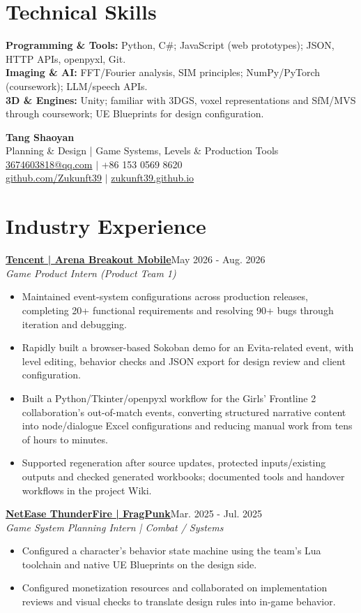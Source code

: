 \documentclass[a4paper,11pt]{article}
\newcommand{\resumeSubheading}[3]{\textbf{#1}\hfill{\small #3}\\{\small\textit{#2}}\par\vspace{3pt}}
\newcommand{\resumeItemListStart}{\begin{itemize}[leftmargin=13pt,label=\textbullet,itemsep=2.5pt,topsep=3pt,parsep=0pt]\fontsize{10.5pt}{13.2pt}\selectfont}
\newcommand{\resumeItemListEnd}{\end{itemize}\vspace{2pt}}
\newcommand{\resumeItem}[1]{\item #1}
\begin{document}
\section{Technical Skills}
{\fontsize{10.5pt}{13.2pt}\selectfont
\textbf{Programming \& Tools:} Python, C\#; JavaScript (web prototypes); JSON, HTTP APIs, openpyxl, Git.\\[2pt]
\textbf{Imaging \& AI:} FFT/Fourier analysis, SIM principles; NumPy/PyTorch (coursework); LLM/speech APIs.\\[2pt]
\textbf{3D \& Engines:} Unity; familiar with 3DGS, voxel representations and SfM/MVS through coursework; UE Blueprints for design configuration.\\[2pt]
}
\newpage
\begin{center}
{\Huge\bfseries Tang Shaoyan}\\[3pt]
{\small Planning \& Design | Game Systems, Levels \& Production Tools}\\[3pt]
{\small \href{mailto:3674603818@qq.com}{3674603818@qq.com} $|$ +86 153 0569 8620}\\[2pt]
{\small \href{https://github.com/Zukunft39}{github.com/Zukunft39} $|$ \href{https://zukunft39.github.io}{zukunft39.github.io}}
\end{center}\vspace{-6pt}
\section{Industry Experience}
\resumeSubheading{\href{https://zukunft39.github.io/projects/tencent.html}{Tencent | Arena Breakout Mobile}}{Game Product Intern (Product Team 1)}{May 2026 - Aug. 2026}
\resumeItemListStart
\resumeItem{Maintained event-system configurations across production releases, completing 20+ functional requirements and resolving 90+ bugs through iteration and debugging.}
\resumeItem{Rapidly built a browser-based Sokoban demo for an Evita-related event, with level editing, behavior checks and JSON export for design review and client configuration.}
\resumeItem{Built a Python/Tkinter/openpyxl workflow for the Girls' Frontline 2 collaboration's out-of-match events, converting structured narrative content into node/dialogue Excel configurations and reducing manual work from tens of hours to minutes.}
\resumeItem{Supported regeneration after source updates, protected inputs/existing outputs and checked generated workbooks; documented tools and handover workflows in the project Wiki.}
\resumeItemListEnd
\resumeSubheading{\href{https://zukunft39.github.io/projects/netease.html}{NetEase ThunderFire | FragPunk}}{Game System Planning Intern | Combat / Systems}{Mar. 2025 - Jul. 2025}
\resumeItemListStart
\resumeItem{Configured a character's behavior state machine using the team's Lua toolchain and native UE Blueprints on the design side.}
\resumeItem{Configured monetization resources and collaborated on implementation reviews and visual checks to translate design rules into in-game behavior.}
\resumeItemListEnd
\end{document}
